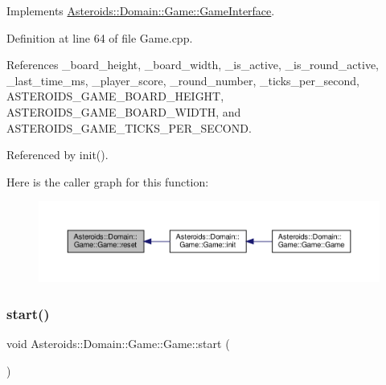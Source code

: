 Implements \hyperlink{classAsteroids_1_1Domain_1_1Game_1_1GameInterface_ae68b2eaf69d331bd9f90d3297328cc40}{Asteroids\+::\+Domain\+::\+Game\+::\+Game\+Interface}.



Definition at line 64 of file Game.\+cpp.



References \+\_\+board\+\_\+height, \+\_\+board\+\_\+width, \+\_\+is\+\_\+active, \+\_\+is\+\_\+round\+\_\+active, \+\_\+last\+\_\+time\+\_\+ms, \+\_\+player\+\_\+score, \+\_\+round\+\_\+number, \+\_\+ticks\+\_\+per\+\_\+second, A\+S\+T\+E\+R\+O\+I\+D\+S\+\_\+\+G\+A\+M\+E\+\_\+\+B\+O\+A\+R\+D\+\_\+\+H\+E\+I\+G\+HT, A\+S\+T\+E\+R\+O\+I\+D\+S\+\_\+\+G\+A\+M\+E\+\_\+\+B\+O\+A\+R\+D\+\_\+\+W\+I\+D\+TH, and A\+S\+T\+E\+R\+O\+I\+D\+S\+\_\+\+G\+A\+M\+E\+\_\+\+T\+I\+C\+K\+S\+\_\+\+P\+E\+R\+\_\+\+S\+E\+C\+O\+ND.



Referenced by init().

Here is the caller graph for this function\+:\nopagebreak
\begin{figure}[H]
\begin{center}
\leavevmode
\includegraphics[width=350pt]{classAsteroids_1_1Domain_1_1Game_1_1Game_a61e639ba44b16737fdfe26887dba965f_icgraph}
\end{center}
\end{figure}
\mbox{\label{classAsteroids_1_1Domain_1_1Game_1_1Game_a824018131c10d49c8addd305ff36209b}} 
\subsubsection{\texorpdfstring{start()}{start()}}
{\footnotesize\ttfamily void Asteroids\+::\+Domain\+::\+Game\+::\+Game\+::start (\begin{DoxyParamCaption}{ }\end{DoxyParamCaption})\hspace{0.3cm}{\ttfamily [virtual]}}



